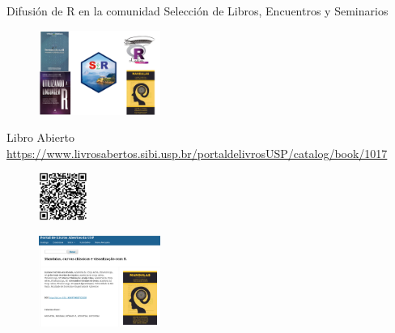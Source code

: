 \documentclass[
  ignorenonframetext,
]{beamer}
\begin{document}
\begin{frame}{Difusión de R en la comunidad}
\protect\hypertarget{difusiuxf3n-de-r-en-la-comunidad}{}
Selección de Libros, Encuentros y Seminarios

\begin{figure}

{\centering \includegraphics[width=1.5625in,height=\textheight]{FigurasLatinR2023/Introducao.png}

}

\end{figure}
\end{frame}

\begin{frame}{Libro Abierto}
\protect\hypertarget{libro-abierto}{}
\url{https://www.livrosabertos.sibi.usp.br/portaldelivrosUSP/catalog/book/1017}

\begin{figure}

{\centering \includegraphics[width=0.625in,height=\textheight]{FigurasLatinR2023/QRCODE_livro.png}

}

\end{figure}

\begin{figure}

{\centering \includegraphics[width=1.5625in,height=\textheight]{FigurasLatinR2023/FigLivro01.png}

}

\end{figure}
\end{frame}
\end{document}
